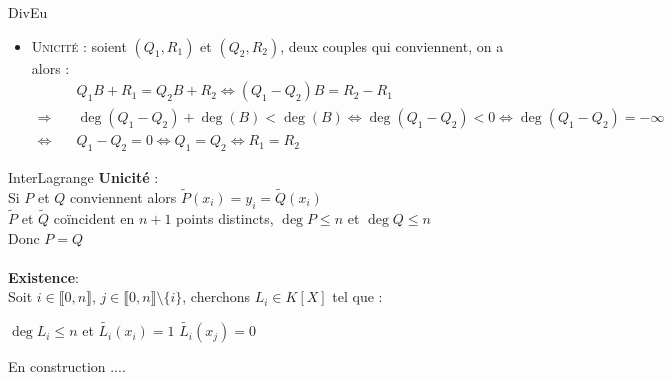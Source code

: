 \documentclass[12pt,a4paper]{report}
\begin{document}
\begin{demonstration}{DivEu}
\begin{itemize}
        \item \textsc{Unicité} : soient $(Q_1, R_1)$ et $(Q_2, R_2)$, deux couples qui conviennent, on a alors :
        \begin{align*}
            &Q_1 B + R_1 = Q_2 B + R_2
            \Leftrightarrow (Q_1 - Q_2)B = R_2 - R_1 \\
            \Rightarrow\quad &\deg(Q_1 - Q_2) + \deg(B) < \deg(B)
            \Leftrightarrow \deg(Q_1 - Q_2) < 0
            \Leftrightarrow \deg(Q_1 - Q_2) = - \infty \\
            \Leftrightarrow\quad &Q_1 - Q_2 = 0
            \Leftrightarrow Q_1 = Q_2
            \Leftrightarrow R_1 = R_2
        \end{align*}
    \end{itemize}
\end{demonstration}

\begin{demonstration}{InterLagrange}
\textbf{Unicité} : \\
Si $P$ et $Q$ conviennent alors $\widetilde{P}(x_{i})=y_{i}=\widetilde{Q}(x_{i})$ \\
$\widetilde{P}$ et $\widetilde{Q}$ coïncident en $n+1$ points distincts, $\deg P \leq n$ et $\deg Q \leq n$\\
Donc $P=Q$ \\
\\
\textbf{Existence}: \\
Soit $i\in \llbracket0,n\rrbracket$, $j\in \llbracket0,n\rrbracket \setminus \lbrace i\rbrace$, cherchons $L_{i} \in K[X]$ tel que : \\
\begin{center}
$\deg L_{i} \leq n$ \: \: et \: \:$\widetilde{L_{i}}(x_{i})=1$ \: \: \: $\widetilde{L_{i}}(x_{j})=0$
\end{center}

En construction .... 
\end{demonstration}
\end{document}
